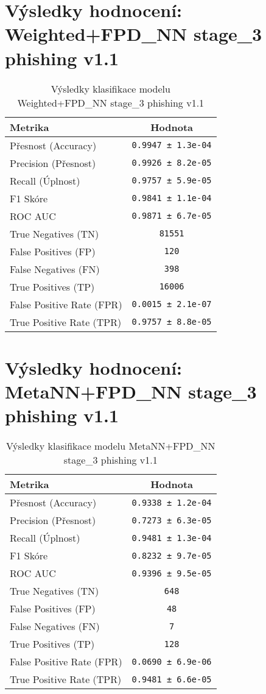 \section*{Výsledky hodnocení: Weighted+FPD_NN stage_3 phishing v1.1}
\begin{table}[h!]
\centering
\begin{tabular}{|l|c|}
\hline
\textbf{Metrika} & \textbf{Hodnota} \\
\hline
Přesnost (Accuracy) & \texttt{0.9947 ± 1.3e-04} \\
Precision (Přesnost) & \texttt{0.9926 ± 8.2e-05} \\
Recall (Úplnost) & \texttt{0.9757 ± 5.9e-05} \\
F1 Skóre & \texttt{0.9841 ± 1.1e-04} \\
ROC AUC & \texttt{0.9871 ± 6.7e-05} \\
True Negatives (TN) & \texttt{81551} \\
False Positives (FP) & \texttt{120} \\
False Negatives (FN) & \texttt{398} \\
True Positives (TP) & \texttt{16006} \\
False Positive Rate (FPR) & \texttt{0.0015 ± 2.1e-07} \\
True Positive Rate (TPR) & \texttt{0.9757 ± 8.8e-05} \\
\hline
\end{tabular}
\caption{Výsledky klasifikace modelu Weighted+FPD_NN stage_3 phishing v1.1}
\label{tab:phishing_weighted+fpd_nn}
\end{table}

\section*{Výsledky hodnocení: MetaNN+FPD_NN stage_3 phishing v1.1}
\begin{table}[h!]
\centering
\begin{tabular}{|l|c|}
\hline
\textbf{Metrika} & \textbf{Hodnota} \\
\hline
Přesnost (Accuracy) & \texttt{0.9338 ± 1.2e-04} \\
Precision (Přesnost) & \texttt{0.7273 ± 6.3e-05} \\
Recall (Úplnost) & \texttt{0.9481 ± 1.3e-04} \\
F1 Skóre & \texttt{0.8232 ± 9.7e-05} \\
ROC AUC & \texttt{0.9396 ± 9.5e-05} \\
True Negatives (TN) & \texttt{648} \\
False Positives (FP) & \texttt{48} \\
False Negatives (FN) & \texttt{7} \\
True Positives (TP) & \texttt{128} \\
False Positive Rate (FPR) & \texttt{0.0690 ± 6.9e-06} \\
True Positive Rate (TPR) & \texttt{0.9481 ± 6.6e-05} \\
\hline
\end{tabular}
\caption{Výsledky klasifikace modelu MetaNN+FPD_NN stage_3 phishing v1.1}
\label{tab:phishing_metann+fpd_nn}
\end{table}

